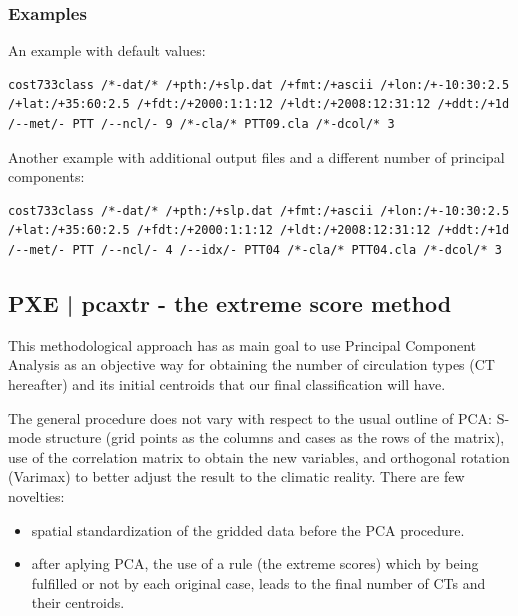 \documentclass[12pt, oneside, a4paper, headsepline, plainheadsepline]{scrbook}
\begin{document}
\subsubsection*{Examples}
An example with default values:
\begin{lstlisting}
cost733class /*-dat/* /+pth:/+slp.dat /+fmt:/+ascii /+lon:/+-10:30:2.5 /+lat:/+35:60:2.5 /+fdt:/+2000:1:1:12 /+ldt:/+2008:12:31:12 /+ddt:/+1d /--met/- PTT /--ncl/- 9 /*-cla/* PTT09.cla /*-dcol/* 3 
\end{lstlisting}
Another example with additional output files and a different number of principal components:
\begin{lstlisting}
cost733class /*-dat/* /+pth:/+slp.dat /+fmt:/+ascii /+lon:/+-10:30:2.5 /+lat:/+35:60:2.5 /+fdt:/+2000:1:1:12 /+ldt:/+2008:12:31:12 /+ddt:/+1d /--met/- PTT /--ncl/- 4 /--idx/- PTT04 /*-cla/* PTT04.cla /*-dcol/* 3 
\end{lstlisting}

\subsection{PXE | pcaxtr - the extreme score method}


This methodological approach has as main goal to use Principal Component Analysis as an objective way for obtaining the number of circulation types (CT hereafter) and its initial centroids that our final classification will have. 

The general procedure does not vary with respect to the usual outline of PCA: S-mode structure (grid points as the columns and cases as the rows of the matrix), use of the correlation matrix to obtain the new variables, and orthogonal rotation (Varimax) to better adjust the result to the climatic reality. There are few novelties: 

\begin{itemize}
\item spatial standardization of the gridded data before the PCA procedure.
\item after aplying PCA, the use of a rule (the extreme scores) which by being fulfilled or not by each original case, leads to the final number of CTs and their centroids.
\end{itemize}
\end{document}
